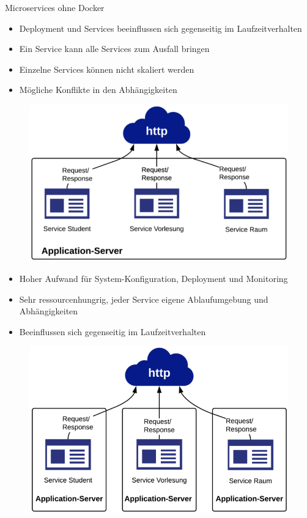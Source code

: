 \documentclass[final]{beamer}
\newlength{\onecolwid}
\begin{document}
\begin{frame}
\begin{columns}[t]
\begin{column}{\onecolwid}
\begin{block}{Microservices ohne Docker}

\begin{itemize}
	\item Deployment und Services beeinflussen sich gegenseitig im Laufzeitverhalten
	\item Ein Service kann alle Services zum Ausfall bringen
	\item Einzelne Services können nicht skaliert werden
	\item Mögliche Konflikte in den Abhängigkeiten
\end{itemize}

\begin{figure}
\includegraphics[scale=0.75]{as}	
\end{figure}

\begin{itemize}
\item Hoher Aufwand für System-Konfiguration, Deployment und Monitoring
\item Sehr ressourcenhungrig, jeder Service eigene Ablaufumgebung und Abhängigkeiten
\item Beeinflussen sich gegenseitig im Laufzeitverhalten
\end{itemize}

\begin{figure}
\includegraphics[scale=0.75]{as_mu}	
\end{figure}


\end{block}
\end{column}
\end{columns}
\end{frame}
\end{document}
